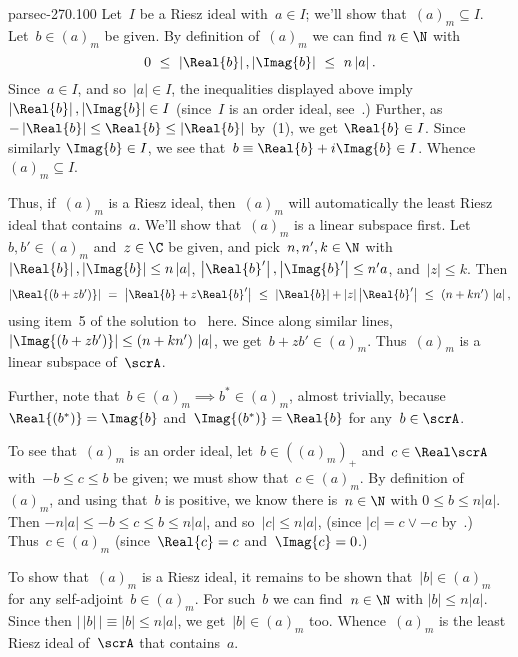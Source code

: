 \documentclass[b5page]{book}
\begin{document}
\begin{solution}{parsec-270.100}
Let~$I$ be a Riesz ideal with~$a\in I$;
we'll show that~$(a)_m \subseteq I$.
Let~$b\in (a)_m$ be given.
By definition of~$(a)_m$ we can
find $n\in \N$ with 
$$\textstyle 0\ \leq\  \left|\Real{b}\right|,
\left|\Imag{b}\right|\ \leq\  n\left|a\right|.$$
Since~$a\in I$, and so~$\left|a\right|\in I$,
the inequalities displayed above imply
$\left|\Real{b}\right|,\left|\Imag{b}\right|\in I$
(since~$I$ is an order ideal, 
see~.)
Further, as $-\left|\Real{b}\right|\leq \Real{b} \leq \left|\Real{b}\right|$
by~(1),
we get $\Real{b}\in I$.
Since similarly $\Imag{b}\in I$,
we see that~$b\equiv \Real{b}+i\Imag{b}\in I$.
Whence~$(a)_m\subseteq I$.

Thus, if~$(a)_m$ is a Riesz ideal,
then~$(a)_m$  will automatically the least Riesz ideal that contains~$a$.
We'll show that~$(a)_m$ is a linear subspace first.
Let $b,b'\in (a)_m$
and~$z\in\C$
be given, and pick~$n,n',k\in \N$ 
with $\left|\Real{b}\right|,\left|\Imag{b}\right|
\leq n \left|a\right|$, 
$\left|\Real{b}'\right|,\left|\Imag{b}'\right|\leq n'a$,
and~$\left|z\right|\leq k$.
Then 
$$\textstyle 
\left|\Real{(b+zb')}\right|
\ =\ \left|\Real{b}+z\Real{b}'\right|
\ \leq\  \left|\Real{b}\right|+\left|z\right| \left|\Real{b}'\right|
\ \leq\  (n+kn')\,\left|a\right|,
$$
using item~5 of the solution to~ here.
Since along similar lines, $\left|\Imag{(b+zb')}\right|
\leq (n+kn')\,\left|a\right|$,
we get~$b+zb'\in (a)_m$.
Thus~$(a)_m$ is a linear subspace of~$\scrA$.

Further, note that~$b\in (a)_m\implies b^*\in(a)_m$,
almost trivially,
because  $\Real{(b^*)}=\Imag{b}$
and~$\Imag{(b^*)}=\Real{b}$
for any~$b\in\scrA$.

To see that~$(a)_m$ is an order ideal,
let~$b\in ((a)_m)_+$ and~$c\in \Real\scrA$
with~$-b\leq c\leq b$ be given;
we must show that~$c\in (a)_m$.
By definition of~$(a)_m$,
and using that~$b$ is positive,
we know there is~$n\in\N$ with
$0\leq b\leq n \left|a\right|$.
Then 
$-n\left|a\right| \leq -b \leq c \leq b \leq n\left| a\right| $,
and so~$\left|c\right| \leq n\left|a\right|$,
(since $\left|c\right|= c\vee -c$ by~.)
Thus~$c\in (a)_m$
(since~$\Real{c}=c$ and~$\Imag{c}=0$.)

To show that~$(a)_m$ is a Riesz ideal,
it remains to be shown that~$\left|b\right|\in (a)_m$
for any self-adjoint~$b\in (a)_m$.
For such~$b$ we can find~$n\in\N$ with
$ \left|b\right|  \leq n\left|a\right|$.
Since then
 $\left| \,\left|b\right|\,\right|
\equiv \left|b\right| \leq n\left|a\right|$,
we get~$\left|b\right|\in(a)_m$ too.
Whence~$(a)_m$ is the least Riesz ideal of~$\scrA$
that contains~$a$.


\end{solution}
\end{document}

